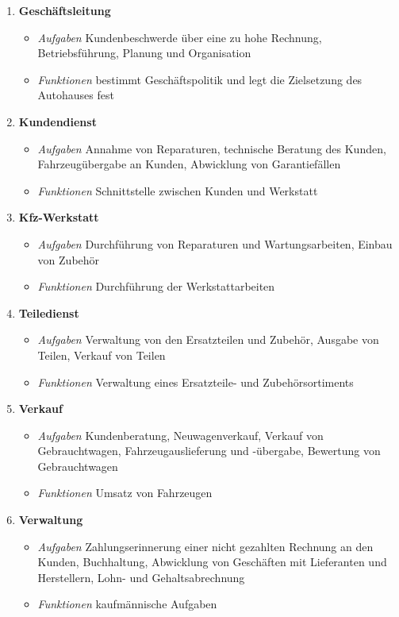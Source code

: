 \begin{enumerate}
\item
  \textbf{Geschäftsleitung}

  \begin{itemize}
  \item
    \emph{Aufgaben} Kundenbeschwerde über eine zu hohe Rechnung,
    Betriebsführung, Planung und Organisation
  \item
    \emph{Funktionen} bestimmt Geschäftspolitik und legt die Zielsetzung
    des Autohauses fest
  \end{itemize}
\item
  \textbf{Kundendienst}

  \begin{itemize}
  \item
    \emph{Aufgaben} Annahme von Reparaturen, technische Beratung des
    Kunden, Fahrzeugübergabe an Kunden, Abwicklung von Garantiefällen
  \item
    \emph{Funktionen} Schnittstelle zwischen Kunden und Werkstatt
  \end{itemize}
\item
  \textbf{Kfz-Werkstatt}

  \begin{itemize}
  \item
    \emph{Aufgaben} Durchführung von Reparaturen und Wartungsarbeiten,
    Einbau von Zubehör
  \item
    \emph{Funktionen} Durchführung der Werkstattarbeiten
  \end{itemize}
\item
  \textbf{Teiledienst}

  \begin{itemize}
  \item
    \emph{Aufgaben} Verwaltung von den Ersatzteilen und Zubehör, Ausgabe
    von Teilen, Verkauf von Teilen
  \item
    \emph{Funktionen} Verwaltung eines Ersatzteile- und
    Zubehörsortiments
  \end{itemize}
\item
  \textbf{Verkauf}

  \begin{itemize}
  \item
    \emph{Aufgaben} Kundenberatung, Neuwagenverkauf, Verkauf von
    Gebrauchtwagen, Fahrzeugauslieferung und -übergabe, Bewertung von
    Gebrauchtwagen
  \item
    \emph{Funktionen} Umsatz von Fahrzeugen
  \end{itemize}
\item
  \textbf{Verwaltung}

  \begin{itemize}
  \item
    \emph{Aufgaben} Zahlungserinnerung einer nicht gezahlten Rechnung an
    den Kunden, Buchhaltung, Abwicklung von Geschäften mit Lieferanten
    und Herstellern, Lohn- und Gehaltsabrechnung
  \item
    \emph{Funktionen} kaufmännische Aufgaben
  \end{itemize}
\end{enumerate}


